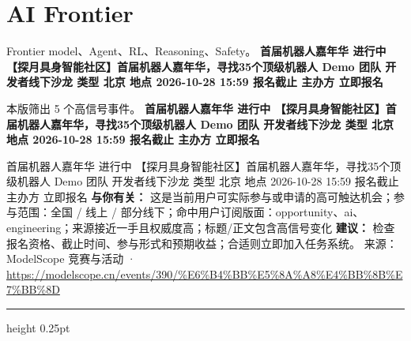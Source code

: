 \documentclass[10.5pt]{ctexart}
\begin{document}
\section*{AI Frontier}
{\color{ormuted} Frontier model、Agent、RL、Reasoning、Safety。}
\vspace{2mm}
{\LARGE\bfseries 首届机器人嘉年华 进行中 【探月具身智能社区】首届机器人嘉年华，寻找35个顶级机器人 Demo 团队 开发者线下沙龙 类型 北京 地点 2026-10-28 15:59 报名截止 主办方 立即报名}\par
\vspace{1mm}
{\color{ormuted} 本版筛出 5 个高信号事件。}
\vspace{3mm}
{\Large\bfseries 首届机器人嘉年华 进行中 【探月具身智能社区】首届机器人嘉年华，寻找35个顶级机器人 Demo 团队 开发者线下沙龙 类型 北京 地点 2026-10-28 15:59 报名截止 主办方 立即报名}\par
首届机器人嘉年华 进行中 【探月具身智能社区】首届机器人嘉年华，寻找35个顶级机器人 Demo 团队 开发者线下沙龙 类型 北京 地点 2026-10-28 15:59 报名截止 主办方 立即报名
\textbf{与你有关：} 这是当前用户可实际参与或申请的高可触达机会；参与范围：全国 / 线上 / 部分线下；命中用户订阅版面：opportunity、ai、engineering；来源接近一手且权威度高；标题/正文包含高信号变化
\textbf{建议：} 检查报名资格、截止时间、参与形式和预期收益；合适则立即加入任务系统。
{\footnotesize\color{ormuted} 来源：ModelScope 竞赛与活动 · \url{https://modelscope.cn/events/390/%E6%B4%BB%E5%8A%A8%E4%BB%8B%E7%BB%8D}}
\vspace{4mm}
\hrule height 0.25pt
\vspace{3mm}
\end{document}
